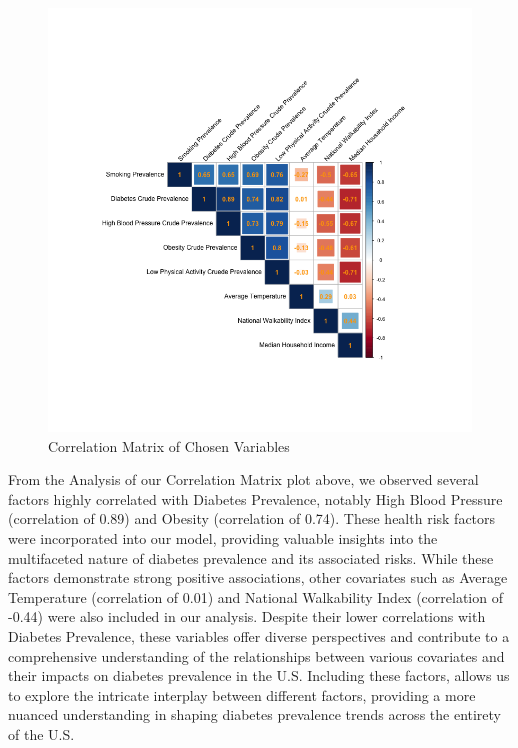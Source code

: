 \documentclass[
]{article}
\begin{document}
\begin{figure}[H]

{\centering \includegraphics{correlation_plot.png}

}

\caption{Correlation Matrix of Chosen Variables}

\end{figure}%

From the Analysis of our Correlation Matrix plot above, we observed
several factors highly correlated with Diabetes Prevalence, notably High
Blood Pressure (correlation of 0.89) and Obesity (correlation of 0.74).
These health risk factors were incorporated into our model, providing
valuable insights into the multifaceted nature of diabetes prevalence
and its associated risks. While these factors demonstrate strong
positive associations, other covariates such as Average Temperature
(correlation of 0.01) and National Walkability Index (correlation of
-0.44) were also included in our analysis. Despite their lower
correlations with Diabetes Prevalence, these variables offer diverse
perspectives and contribute to a comprehensive understanding of the
relationships between various covariates and their impacts on diabetes
prevalence in the U.S. Including these factors, allows us to explore the
intricate interplay between different factors, providing a more nuanced
understanding in shaping diabetes prevalence trends across the entirety
of the U.S.
\end{document}

